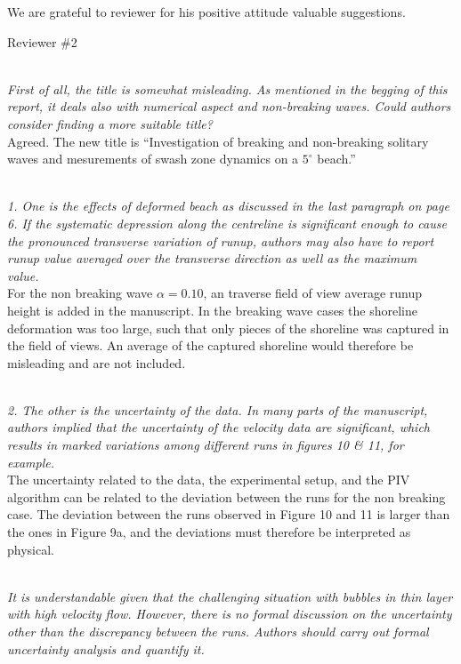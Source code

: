 \documentclass[11pt]{article}
\begin{document}
\newcommand{\refpoint}[1]{\ \vspace{0.3cm}\\ {\em #1}\  \vspace{0.3cm}\\ }
\newcommand{\todo}[1]{\ \\ {\bf To do: #1}}

We are grateful to reviewer for his positive attitude valuable suggestions.

Reviewer \#2

\refpoint{First of all, the title is somewhat misleading. As mentioned in the begging of this report, it deals also with 
numerical aspect and non-breaking waves. Could authors consider finding a more suitable title?}
Agreed.
The new title is ``Investigation of breaking and non-breaking solitary waves and mesurements of swash zone dynamics on 
a $5^\circ$ beach.''

\refpoint{1. One is the effects of deformed beach as discussed in the last paragraph on page 6. If the systematic depression along the centreline is significant enough to cause the pronounced transverse variation of runup, authors may also have to report runup value averaged over the transverse direction as well as the maximum value.}

For the non breaking wave $\alpha =0.10$, an traverse field of view average runup height is added in the manuscript. In the breaking wave cases the shoreline deformation was too large, such that only pieces of the shoreline was captured in the field of views. An average of the captured shoreline would therefore be misleading and are not included. 

\refpoint{2. The other is the uncertainty of the data. In many parts of the manuscript, authors implied that the uncertainty of the velocity data are significant, which results in marked variations among different runs in figures 10 \& 11, for example.}

The uncertainty related to the data, the experimental setup, and the PIV algorithm can be related to the deviation between the runs for the non breaking case. The deviation  between the runs observed in Figure 10 and 11 is larger than the ones in Figure 9a, and the deviations must therefore be interpreted as physical.


\refpoint{ It is understandable given that the challenging situation with bubbles in thin layer with high velocity flow. However, there is no formal discussion on the uncertainty other than the discrepancy between the runs. Authors should carry out formal uncertainty analysis and quantify it.}
\end{document}
